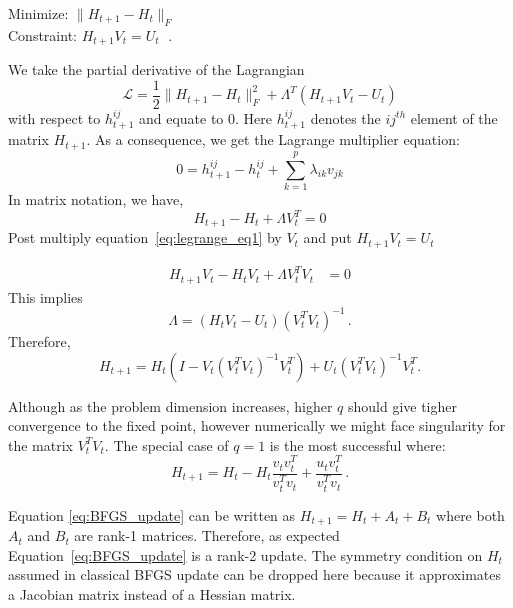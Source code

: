 \documentclass[12pt]{article}
\begin{document}
\begin{center}
    Minimize: $\|H_{t+1} - H_t\|_F$\\
    Constraint: $H_{t+1}V_t = U_t\;$ .
\end{center}

We take the partial derivative of the Lagrangian
\[
\mathcal{L} = \dfrac{1}{2}\|H_{t+1} - H_t\|^2_F + \Lambda^T(H_{t+1}V_t - U_t)
\]
with respect to $h_{t+1}^{ij}$ and equate to 0. Here $h_{t+1}^{ij}$ denotes the $ij^{th}$ element of the matrix $H_{t+1}$. As a consequence, we get the Lagrange multiplier equation:
\[
0 = h_{t+1}^{ij} - h_t^{ij} + \sum_{k=1}^{p}\lambda_{ik}v_{jk}
\]
In matrix notation, we have,
\begin{equation} \label{eq:legrange_eq1}
H_{t+1} - H_t + \Lambda V_t^T = 0    
\end{equation}
Post multiply equation~\ref{eq:legrange_eq1} by $V_t$ and put $H_{t+1}V_t = U_t$

\begin{align*}
    H_{t+1}V_t - H_tV_t + \Lambda V_t^T V_t &= 0
\end{align*}
This implies
\[
     \Lambda = (H_t V_t - U_t)(V_t^TV_t)^{-1}\,.
\]
Therefore, 
\[
H_{t+1} = H_t\left(I - V_t (V_t^T V_t)^{-1}V_t^T\right) + U_t(V_t^T V_t)^{-1}V_t^T.
\]

Although as the problem dimension increases, higher $q$ should give tigher convergence to the fixed point, however numerically we might face singularity for the matrix $V_t^T V_t$. The special case of $q=1$ is the most successful  where:
\begin{equation} \label{eq:BFGS_update}
    H_{t+1} = H_t - H_t\dfrac{v_tv_t^T}{v_t^Tv_t} + \dfrac{u_tv_t^T}{v_t^Tv_t}\,.
\end{equation}

Equation \ref{eq:BFGS_update} can be written as $H_{t+1} = H_t + A_t + B_t$ where both $A_t$ and $B_t$ are rank-1 matrices. Therefore, as expected Equation~\ref{eq:BFGS_update} is a rank-2 update. The symmetry condition on $H_t$ assumed in classical BFGS update can be dropped here because it approximates a Jacobian matrix instead of a Hessian matrix.
\end{document}
